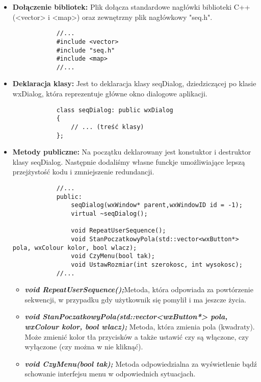 \documentclass[]{report}
\begin{document}
	\begin{itemize}
		
		\item \textbf{Dołączenie bibliotek:} Plik dołącza standardowe nagłówki biblioteki C++ (<vector> i <map>) oraz zewnętrzny plik nagłówkowy "seq.h".
		
		\begin{lstlisting}
			//...
			#include <vector>
			#include "seq.h"
			#include <map>
			//...
		\end{lstlisting}
		
		\item \textbf{Deklaracja klasy:} Jest to deklaracja klasy seqDialog, dziedziczącej po klasie wxDialog, która reprezentuje główne okno dialogowe aplikacji.
		
		\begin{lstlisting}
			class seqDialog: public wxDialog
			{
				// ... (treść klasy)
			};
		\end{lstlisting}
		
		\item \textbf{Metody publiczne:} Na początku deklarowany jest konstuktor i destruktor klasy seqDialog. Następnie dodaliśmy własne funckje umożliwiające lepszą przejżystość kodu i zmniejszenie redundancji.
		
		\begin{lstlisting}
			//...
			public:
				seqDialog(wxWindow* parent,wxWindowID id = -1);
				virtual ~seqDialog();
				
				void RepeatUserSequence();
				void StanPoczatkowyPola(std::vector<wxButton*> pola, wxColour kolor, bool wlacz);
				void CzyMenu(bool tak);
				void UstawRozmiar(int szerokosc, int wysokosc);
			//...
		\end{lstlisting}
		\begin{itemize}
				\item \textit{\textbf{void RepeatUserSequence();}}Metoda, która odpowiada za powtórzenie sekwencji, w przypadku gdy użytkownik się pomylił i ma jeszcze życia.
			
			\item \textit{\textbf{void StanPoczatkowyPola(std::vector<wxButton*> pola, wxColour kolor, bool wlacz);}} Metoda, która zmienia pola (kwadraty). Może zmienić kolor tła przycisków a także ustawić czy są włączone, czy wyłączone (czy można w nie kliknąć).
			
			\item \textit{\textbf{void CzyMenu(bool tak);}} Metoda odpowiedzialna za wyświetlenie bądź schowanie interfejsu menu w odpowiednich sytuacjach.
			

\end{itemize}
\end{itemize}
\end{document}
